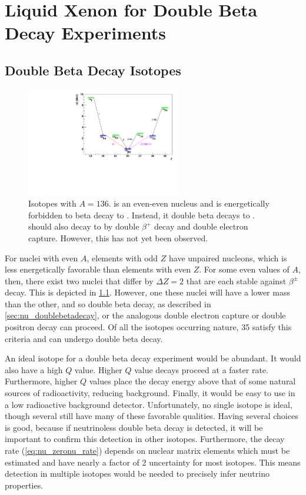 \documentclass[herrin-thesis.tex]{subfiles}
\begin{document}
\chapter[LXe for \(\beta\beta\) decay experiments]{Liquid Xenon for Double Beta Decay Experiments}
\label{ch:liquidxe}

\section{Double Beta Decay Isotopes}
\begin{figure}[htb]
\centering
\includegraphics[width=0.6\textwidth]{./plots/xe_nuclei_masses.pdf}
\caption[Nuclear decay structure for \(A=136\)]{Isotopes with \(A=136\).  is an even-even nucleus and is energetically forbidden to beta decay to . Instead, it double beta decays to .  should also decay to  by double \(\beta^{+}\) decay and double electron capture. However, this has not yet been observed.}
\label{fig:xe_nuclei_masses}
\end{figure}

For nuclei with even \(A\), elements with odd \(Z\) have unpaired nucleons, which is less energetically favorable than elements with even \(Z\). For some even values of \(A\), then, there exist two nuclei that differ by \(\Delta Z = 2\) that are each stable against \(\beta^{\pm}\) decay. This is depicted in \cref{fig:xe_nuclei_masses}. However, one these nuclei will have a lower mass than the other, and so double beta decay, as described in \cref{sec:nu_doublebetadecay}, or the analogous double electron capture or double positron decay can proceed. Of all the isotopes occurring nature, 35 satisfy this criteria and can undergo double beta decay.

An ideal isotope for a double beta decay experiment would be abundant. It would also have a high \(Q\) value. Higher \(Q\) value decays proceed at a faster rate. Furthermore, higher \(Q\) values place the decay energy above that of some natural sources of radioactivity, reducing background. Finally, it would be easy to use in a low radioactive background detector. Unfortunately, no single isotope is ideal, though several still have many of these favorable qualities. Having several choices is good, because if neutrinoless double beta decay is detected, it will be important to confirm this detection in other isotopes. Furthermore, the decay rate (\cref{eq:nu_zeronu_rate}) depends on nuclear matrix elements which must be estimated and have nearly a factor of 2 uncertainty for most isotopes. This means detection in multiple isotopes would be needed to precisely infer neutrino properties.
\end{document}
